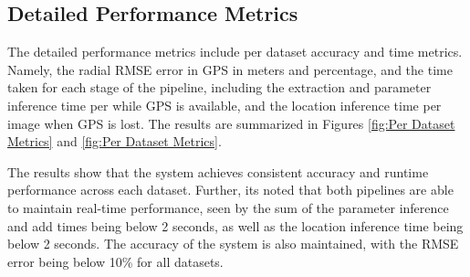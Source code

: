 \subsection{Detailed Performance Metrics}
The detailed performance metrics include per dataset accuracy and time metrics. Namely, the radial RMSE error in GPS in meters and percentage, and the time taken for each stage of the pipeline, including the extraction and parameter inference time per while GPS is available, and the location inference time per image when GPS is lost. The results are summarized in Figures \ref{fig:Per Dataset Metrics} and \ref{fig:Per Dataset Metrics}. 

The results show that the system achieves consistent accuracy and runtime performance across each dataset. Further, its noted that both pipelines are able to maintain real-time performance, seen by the sum of the parameter inference and add times being below 2 seconds, as well as the location inference time being below 2 seconds. The accuracy of the system is also maintained, with the RMSE error being below 10\% for all datasets.


